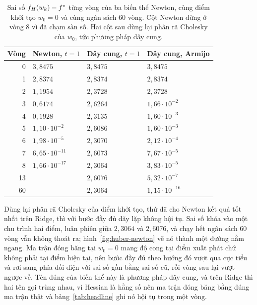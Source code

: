 \documentclass[12pt, a4paper, oneside]{report}
\theoremstyle{definition}
\begin{document}
\begin{table}[tbp]
  \centering
  \caption{Sai số $f_{H}(w_k) - f^{*}$ từng vòng của ba biến thể Newton, cùng
    điểm khởi tạo $w_{0} = 0$ và cùng ngân sách 60 vòng. Cột Newton dừng ở vòng 8
    vì đã chạm sàn số. Hai cột sau dùng lại phân rã Cholesky của $w_{0}$, tức
    phương pháp dây cung.}
  \label{tab:huber-newton}
  \begin{tabular}{rlll}
    \toprule
    Vòng & Newton, $t = 1$ & Dây cung, $t = 1$ & Dây cung, Armijo \\
    \midrule
    0  & $3{,}8475$              & $3{,}8475$ & $3{,}8475$ \\
    1  & $2{,}8374$              & $2{,}8374$ & $2{,}8374$ \\
    2  & $1{,}1954$              & $2{,}3728$ & $2{,}3728$ \\
    3  & $0{,}6174$              & $2{,}6264$ & $1{,}66 \cdot 10^{-2}$ \\
    4  & $0{,}1928$              & $2{,}3135$ & $1{,}60 \cdot 10^{-3}$ \\
    5  & $1{,}10 \cdot 10^{-2}$  & $2{,}6086$ & $1{,}60 \cdot 10^{-3}$ \\
    6  & $1{,}98 \cdot 10^{-5}$  & $2{,}3070$ & $2{,}12 \cdot 10^{-4}$ \\
    7  & $6{,}65 \cdot 10^{-11}$ & $2{,}6073$ & $7{,}67 \cdot 10^{-5}$ \\
    8  & $1{,}66 \cdot 10^{-17}$ & $2{,}3064$ & $3{,}83 \cdot 10^{-5}$ \\
    \midrule
    13 &                         & $2{,}6076$ & $5{,}32 \cdot 10^{-7}$ \\
    60 &                         & $2{,}3064$ & $1{,}15 \cdot 10^{-16}$ \\
    \bottomrule
  \end{tabular}
\end{table}

Dùng lại phân rã Cholesky của điểm khởi tạo, thứ đã cho Newton kết quả tốt nhất
trên Ridge, thì với bước đầy đủ dãy lặp không hội tụ. Sai số khóa vào một chu
trình hai điểm, luân phiên giữa $2{,}3064$ và $2{,}6076$, và chạy hết ngân sách 60
vòng vẫn không thoát ra; hình~\ref{fig:huber-newton} vẽ nó thành một đường nằm
ngang. Ma trận đóng băng tại $w_{0} = 0$ mang độ cong tại điểm xuất phát chứ không
phải tại điểm hiện tại, nên bước đầy đủ theo hướng đó vượt qua cực tiểu và rơi
sang phía đối diện với sai số gần bằng sai số cũ, rồi vòng sau lại vượt ngược về.
Tên đúng của biến thể này là phương pháp dây cung, và trên Ridge thì hai tên gọi
trùng nhau, vì Hessian là hằng số nên ma trận đóng băng bằng đúng ma trận thật và
bảng~\ref{tab:headline} ghi nó hội tụ trong một vòng.
\end{document}
